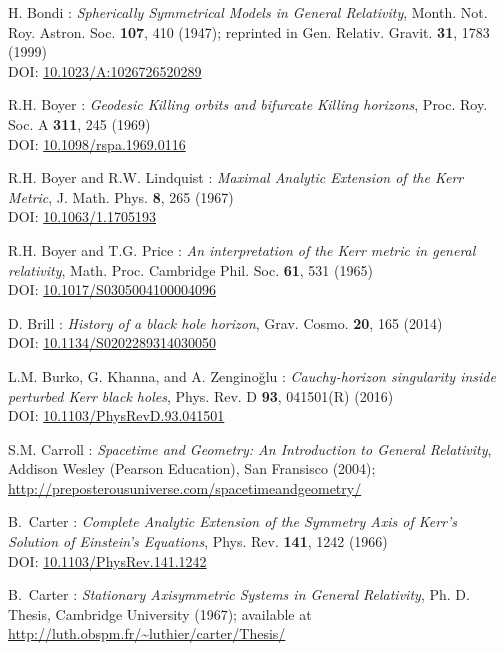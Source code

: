 \begin{thebibliography}{123}
H. Bondi :
{\em Spherically Symmetrical Models in General Relativity},
Month. Not. Roy. Astron. Soc. {\bf 107}, 410 (1947);
reprinted in
Gen. Relativ. Gravit. {\bf 31}, 1783 (1999)\\
DOI: \href{http://dx.doi.org/10.1023/10.1023/A:1026726520289}{10.1023/A:1026726520289}

R.H. Boyer : {\em Geodesic Killing orbits and bifurcate Killing horizons},
Proc. Roy. Soc. A {\bf 311}, 245 (1969)\\
DOI: \href{http://dx.doi.org/10.1098/rspa.1969.0116}{10.1098/rspa.1969.0116}

R.H. Boyer and R.W. Lindquist : {\em Maximal Analytic Extension of the Kerr Metric},
J. Math. Phys. {\bf 8}, 265 (1967)\\
DOI: \href{http://dx.doi.org/10.1063/1.1705193}{10.1063/1.1705193}

R.H. Boyer and T.G. Price : {\em An interpretation of the Kerr metric in general relativity},
Math. Proc. Cambridge Phil. Soc. {\bf 61}, 531 (1965)\\
DOI: \href{http://dx.doi.org/10.1017/S0305004100004096}{10.1017/S0305004100004096}

D. Brill : {\em History of a black hole horizon},
Grav. Cosmo. {\bf 20}, 165 (2014) \\
DOI: \href{http://dx.doi.org/10.1134/S0202289314030050}{10.1134/S0202289314030050}

L.M. Burko, G. Khanna, and A. Zenginoğlu : {\em
Cauchy-horizon singularity inside perturbed Kerr black holes},
Phys. Rev. D {\bf 93}, 041501(R) (2016) \\
DOI: \href{https://doi.org/10.1103/PhysRevD.93.041501}{10.1103/PhysRevD.93.041501}

S.M. Carroll : \emph{Spacetime and Geometry: An Introduction to General Relativity},
Addison Wesley (Pearson Education), San Fransisco (2004); \\
\url{http://preposterousuniverse.com/spacetimeandgeometry/}

B.~Carter :
{\em Complete Analytic Extension of the Symmetry Axis of Kerr's Solution of Einstein's Equations},
Phys. Rev. {\bf 141}, 1242 (1966)\\
DOI: \href{http://dx.doi.org/10.1103/PhysRev.141.1242}{10.1103/PhysRev.141.1242}

B.~Carter : {\em Stationary Axisymmetric Systems in General Relativity},
Ph. D. Thesis, Cambridge University (1967); available at\\
\url{http://luth.obspm.fr/~luthier/carter/Thesis/}


\end{thebibliography}
